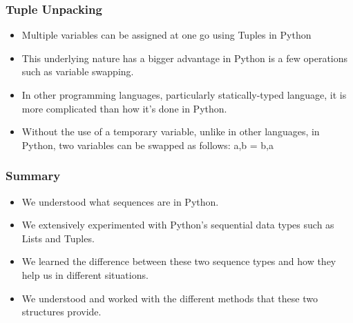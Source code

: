 \documentclass{beamer}
\begin{document}
\begin{frame}
\frametitle{Tuple Unpacking}
\begin{itemize}
\item Multiple variables can be assigned at one go using Tuples in Python
\item This underlying nature has a bigger advantage in Python is a few  operations such as variable swapping.
\item In other programming languages, particularly statically-typed language, it is more complicated than how it's done in Python.
\item Without the use of a temporary variable, unlike in other languages, in Python, two variables can be swapped as follows:
a,b = b,a
\end{itemize}
\end{frame}

\begin{frame}
\frametitle{Summary}
\begin{itemize}
\item We understood what sequences are in Python.
\item We extensively experimented with Python's sequential data types such as Lists and Tuples.
\item We learned the difference between these two sequence types and how they help us in different situations.
\item We understood and worked with the different methods that these two structures provide.
\end{itemize}
\end{frame}
\end{document}
